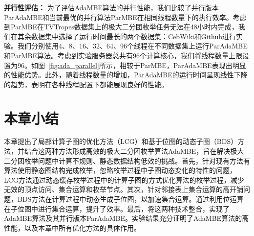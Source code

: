 \textbf{并行性评估：} 为了评估AdaMBE算法的并行性能，我们比较了并行版本ParAdaMBE和当前最优的并行算法ParMBE在相同线程数量下的执行效率。考虑到ParMBE在TVTropes数据集上的极大二分团枚举任务无法在48小时内完成，我们在其余数据集中选择了运行时间最长的两个数据集：CebWiki和Github进行实验。我们分别使用4、8、16、32、64、96个线程在不同数据集上运行ParAdaMBE和ParMBE算法。考虑到实验服务器总共有96个计算核心，我们将线程数量上限设置为96。如图~\ref{fig:ada_parallel}所示，相较于ParMBE，ParAdaMBE表现出明显的性能优势。此外，随着线程数量的增加，ParAdaMBE的运行时间呈现线性下降的趋势，表明在各种线程配置下都能展现良好的性能。




\section{本章小结}

本章提出了局部计算子图的优化方法（LCG）和基于位图的动态子图（BDS）方法，并结合这两种方法形成高效的极大二分团枚举算法AdaMBE，旨在解决极大二分团枚举问题中计算不规则、静态数据结构低效的挑战。首先，针对现有方法有算法使用静态图结构完成枚举，忽略枚举过程中子图动态变化的特性的问题，LCG方法通过动态缓存枚举过程中的计算子图的方式优化算法的枚举过程，减少无效的顶点访问、集合运算和枚举节点。其次，针对邻接表上集合运算的高开销问题，BDS方法在计算过程中动态生成子位图，以加速集合运算。通过利用位运算在子位图中进行集合运算，提升了效率。最后，将这两种技术整合，实现了AdaMBE算法及其并行版本ParAdaMBE。实验结果充分证明了AdaMBE算法的高性能，以及本章中所有优化方法的具体作用。